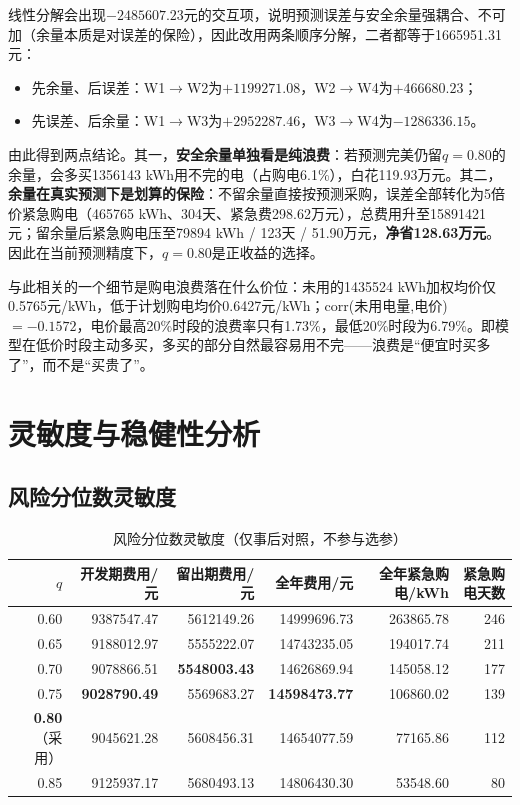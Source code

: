 \documentclass[UTF8,12pt]{ctexart}
\begin{document}
线性分解会出现$-2485607.23$元的交互项，说明预测误差与安全余量强耦合、不可加（余量本质是对误差的保险），因此改用两条顺序分解，二者都等于1665951.31元：
\begin{itemize}
\item 先余量、后误差：W1$\to$W2为$+1199271.08$，W2$\to$W4为$+466680.23$；
\item 先误差、后余量：W1$\to$W3为$+2952287.46$，W3$\to$W4为$-1286336.15$。
\end{itemize}

由此得到两点结论。其一，\textbf{安全余量单独看是纯浪费}：若预测完美仍留$q=0.80$的余量，会多买1356143 kWh用不完的电（占购电6.1\%），白花119.93万元。其二，\textbf{余量在真实预测下是划算的保险}：不留余量直接按预测采购，误差全部转化为5倍价紧急购电（465765 kWh、304天、紧急费298.62万元），总费用升至15891421元；留余量后紧急购电压至79894 kWh / 123天 / 51.90万元，\textbf{净省128.63万元}。因此在当前预测精度下，$q=0.80$是正收益的选择。

与此相关的一个细节是购电浪费落在什么价位：未用的1435524 kWh加权均价仅0.5765元/kWh，低于计划购电均价0.6427元/kWh；$\mathrm{corr}$(未用电量,电价)$=-0.1572$，电价最高20\%时段的浪费率只有1.73\%，最低20\%时段为6.79\%。即模型在低价时段主动多买，多买的部分自然最容易用不完——浪费是“便宜时买多了”，而不是“买贵了”。

\section{灵敏度与稳健性分析}
\subsection{风险分位数灵敏度}
\begin{table}[H]\centering
\caption{风险分位数灵敏度（仅事后对照，不参与选参）}
\begin{tabular}{rrrrrr}\toprule
$q$&开发期费用/元&留出期费用/元&全年费用/元&全年紧急购电/kWh&紧急购电天数\\\midrule
0.60&9387547.47&5612149.26&14999696.73&263865.78&246\\
0.65&9188012.97&5555222.07&14743235.05&194017.74&211\\
0.70&9078866.51&\textbf{5548003.43}&14626869.94&145058.12&177\\
0.75&\textbf{9028790.49}&5569683.27&\textbf{14598473.77}&106860.02&139\\
\textbf{0.80}（采用）&9045621.28&5608456.31&14654077.59&77165.86&112\\
0.85&9125937.17&5680493.13&14806430.30&53548.60&80\\\bottomrule
\end{tabular}
\end{table}
\end{document}
